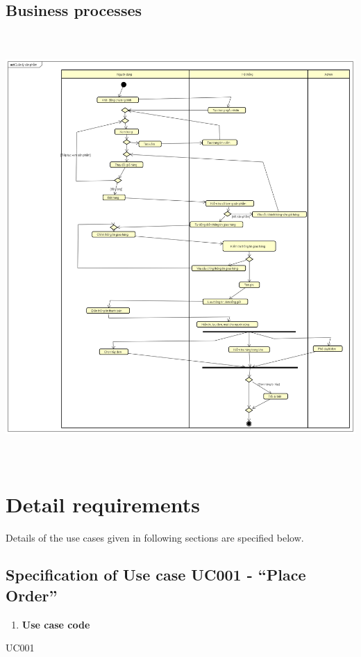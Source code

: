 \documentclass[letterpaper]{report}
\begin{document}
\section{Business processes \ \ \ \ \ \ \ \ }
 \includegraphics[width=15.24cm,height=16.261cm]{UseCaseSpecification-img/UseCaseSpecification-img002.png} 

\chapter{Detail requirements}
Details of the use cases given in following sections are specified below.


\bigskip

\section[Specification of Use case UC001 {}- “Place Order”]{Specification of Use case UC001 - “Place Order”}
\begin{enumerate}
\item \textbf{Use case code}
\end{enumerate}
UC001
\end{document}
